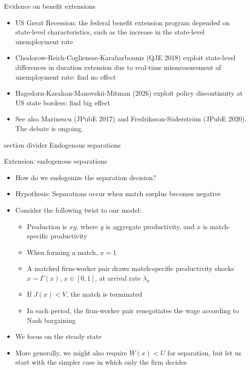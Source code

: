 \documentclass[9pt]{beamer}
\newcommand{\sectiondivider}[1]{
	\begin{frame}[plain]
		\vfill
		\begin{beamercolorbox}[wd=.84\textwidth,sep=1.1em,center,rounded=true]{section divider}
			{\usebeamerfont{section title} #1}
		\end{beamercolorbox}
		\vfill
	\end{frame}
}
\newcommand{\bit}{\begin{itemize}}
\newcommand{\eit}{\end{itemize}}
\begin{document}
\begin{frame}{Evidence on benefit extensions}

\bit
\setlength\itemsep{1em}
	\item US Great Recession: the federal benefit extension program depended on state-level characteristics, such as the increase in the state-level unemployment rate
	\item Chodorow-Reich-Coglienese-Karabarbounis (QJE 2018) exploit state-level differences in duration extension due to real-time mismeasurement of unemployment rate: find no effect
	\item Hagedorn-Karahan-Manovskii-Mitman (2026) exploit policy discontinuity at US state borders: find big effect 
	\item See also Marinescu (JPubE 2017) and Fredriksson-S\"oderstr\"om (JPubE 2020). The debate is ongoing.
\eit
\end{frame}


\sectiondivider{Endogenous separations}


\begin{frame}{Extension: endogenous separations}

\bit
\setlength\itemsep{1.5em}

\item How do we endogenize the separation decision?

\item Hypothesis: Separations occur when match surplus becomes negative

\item Consider the following twist to our model:
\bit
\setlength\itemsep{0.5em}

\item Production is $xy$, where $y$ is aggregate productivity, and $x$ is match-specific productivity

\item When forming a match, $x=1$

\item A matched firm-worker pair draws match-specific productivity shocks $x \sim \Gamma (x)$, $x \in [0, 1]$, at arrival rate $\lambda_x$

\item If $J(x)<V$, the match is terminated

\item In each period, the firm-worker pair renegotiates the wage according to Nash bargaining

\eit

\item We focus on the steady state

\item More generally, we might also require $W(x)<U$ for separation, but let us start with the simpler case in which only the firm decides


\eit
\end{frame}
\end{document}
